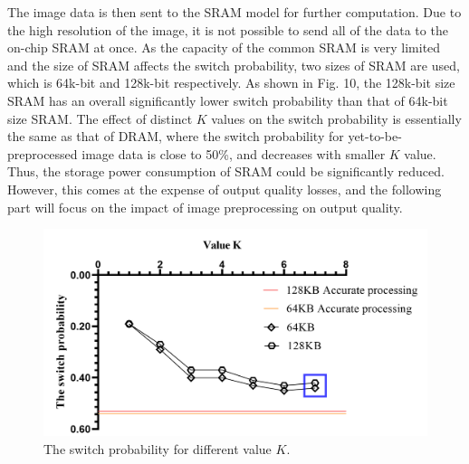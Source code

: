 \documentclass[lettersize,journal]{IEEEtran}
\begin{document}
The image data is then sent to the SRAM model for further computation. Due to the high resolution of the image, it is not possible to send all of the data to the on-chip SRAM at once. As the capacity of the common SRAM is very limited and the size of SRAM affects the switch probability, two sizes of SRAM are used, which is 64k-bit and 128k-bit respectively. As shown in Fig. 10, the 128k-bit size SRAM has an overall significantly lower switch probability than that of 64k-bit size SRAM. The effect of distinct $K$ values on the switch probability is essentially the same as that of DRAM, where the switch probability for yet-to-be-preprocessed image data is close to 50\%, and decreases with smaller $K$ value. Thus, the storage power consumption of SRAM could be significantly reduced. However, this comes at the expense of output quality losses, and the following part will focus on the impact of image preprocessing on output quality.
\begin{figure}[htb]
\centering
\includegraphics[width=\linewidth]{Fig/The switch probability for different value k.png}
\caption{The switch probability for different value $K$.}
\label{fig10}
\end{figure}
\end{document}
